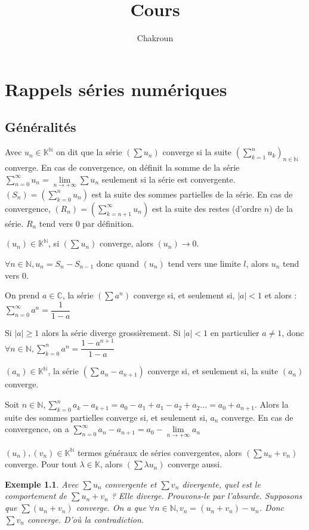 \documentclass[a4paper,12pt]{book}
\title{Cours}
\author{Chakroun}
\newcommand{\Def}[2]{\begin{tcolorbox}[sharp corners, colback=white,colframe=blue!90!black!75, title=Définition : #1]#2\end{tcolorbox}}
\newcommand{\Thr}[2]{\begin{tcolorbox}[sharp corners, colback=white,colframe=red!90!black!75, title=Théorème : #1]#2\end{tcolorbox}}
\newcommand{\Prop}[2]{\begin{tcolorbox}[sharp corners, colback=white,colframe=red!90!black!75, title=Proposition : #1]#2\end{tcolorbox}}
\newcommand{\Pre}[1]{\begin{tcolorbox}[sharp corners, colback=white,colframe=green!60!green!30!black!75, title=Preuve]#1\end{tcolorbox}}
\newtheorem{Exe}{Exemple}[section]
\def\C{\mathbb{C}}
\def\N{\mathbb{N}}
\def\K{\mathbb{K}}
\begin{document}
\tableofcontents
\chapter{Rappels séries numériques}
\section{Généralités}
\Def{Convergence série}{Avec $u_n\in\K^\N$ on dit que la série $(\sum u_n)$ converge si la suite $(\sum\limits_{k=1}^n u_k)_{n\in\N}$ converge. En cas de convergence, on définit la somme de la série $\sum_{n = 0}^{\infty} u_n = \lim\limits_{n\to+\infty} \sum u_n$ seulement si la série est convergente. $(S_n) = \left(\sum\limits_{k=0}^nu_n\right)$ est la suite des sommes partielles de la série. En cas de convergence, $(R_n) =\left(\sum\limits_{k = n+1}^{\infty} u_n\right)$ est la suite des restes (d'ordre $n$) de la série. $R_n$ tend vers 0 par définition.}
\Thr{de divergence grossière}{$(u_n)\in\K^\N$, si $(\sum u_n)$ converge, alors $(u_n)\to0$.}
\Pre{$\forall n\in\N, u_n = S_n-S_{n-1}$ donc quand $(u_n)$ tend vers une limite $l$, alors $u_n$ tend vers 0.}
\Thr{Séries géométriques}{On prend $a\in\C$, la série $(\sum a^n)$ converge si, et seulement si, $\vert a\vert<1$ et alors : $\sum_{n = 0}^{\infty} a^n = \dfrac{1}{1-a}$}
\Pre{Si $\vert a\vert\geq 1$ alors la série diverge grossièrement. Si $\vert a\vert<1$ en particulier $a\neq1$, donc $\forall n\in\N,\sum\limits_{k=0}^n a^n =\dfrac{1-a^{n+1}}{1-a}$}
\Thr{Dominos ou série téléscopique}{$(a_n)\in\K^\N$, la série $(\sum a_n - a_{n+1})$ converge si, et seulement si, la suite $(a_n)$ converge.}
\Pre{Soit $n\in\N, \sum\limits_{k=0}^n a_k - a_{k+1} = a_0 -a_1 + a_1 -a_2+a_2... = a_0+a_{n+1}$. Alors la suite des sommes partielles converge si, et seulement si, $a_n$ converge. En cas de convergence, on a $\sum_{n = 0}^{\infty} a_n - a_{n+1} = a_0 - \lim\limits_{n\to+\infty}a_n$}
\Prop{Opérations sur les séries convergentes}{$(u_n),(v_n)\in\K^\N$ termes généraux de séries convergentes, alors $(\sum u_n + v_n)$ converge. Pour tout $\lambda\in\K$, alors $(\sum \lambda u_n)$ converge aussi.}
\begin{Exe}
Avec $\sum u_n$ convergente et $\sum v_n$ divergente, quel est le comportement de $\sum u_n + v_n$ ? Elle diverge. Prouvons-le par l'absurde. Supposons que $\sum (u_n +v_n)$ converge. On a que $\forall n\in\N, v_n = (u_n + v_n) - u_n$. Donc $\sum v_n$ converge. D'où la contradiction.
\end{Exe}
\end{document}
